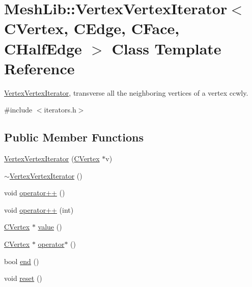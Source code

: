 \hypertarget{class_mesh_lib_1_1_vertex_vertex_iterator}{}\section{Mesh\+Lib\+:\+:Vertex\+Vertex\+Iterator$<$ C\+Vertex, C\+Edge, C\+Face, C\+Half\+Edge $>$ Class Template Reference}
\label{class_mesh_lib_1_1_vertex_vertex_iterator}


\hyperlink{class_mesh_lib_1_1_vertex_vertex_iterator}{Vertex\+Vertex\+Iterator}, transverse all the neighboring vertices of a vertex ccwly.  




{\ttfamily \#include $<$iterators.\+h$>$}

\subsection*{Public Member Functions}
\begin{DoxyCompactItemize}
\item 
\hyperlink{class_mesh_lib_1_1_vertex_vertex_iterator_accadfb697db93459561c07d916519342}{Vertex\+Vertex\+Iterator} (\hyperlink{class_mesh_lib_1_1_c_vertex}{C\+Vertex} $\ast$v)
\item 
\hyperlink{class_mesh_lib_1_1_vertex_vertex_iterator_aa72ea636a0eb13eac5c0309f0aeb5dbe}{$\sim$\+Vertex\+Vertex\+Iterator} ()
\item 
void \hyperlink{class_mesh_lib_1_1_vertex_vertex_iterator_a2e5ca2acaa3484f6e1a41cc3d3688633}{operator++} ()
\item 
void \hyperlink{class_mesh_lib_1_1_vertex_vertex_iterator_a3b300ab317110d48cebfb281583524b7}{operator++} (int)
\item 
\hyperlink{class_mesh_lib_1_1_c_vertex}{C\+Vertex} $\ast$ \hyperlink{class_mesh_lib_1_1_vertex_vertex_iterator_a469255261d5be758b575bfb7203916a4}{value} ()
\item 
\hyperlink{class_mesh_lib_1_1_c_vertex}{C\+Vertex} $\ast$ \hyperlink{class_mesh_lib_1_1_vertex_vertex_iterator_ad3a5cb15e9e639451530ba39ecf33cda}{operator$\ast$} ()
\item 
bool \hyperlink{class_mesh_lib_1_1_vertex_vertex_iterator_a8609fe0fa5480e662595342a9efb25ca}{end} ()
\item 
void \hyperlink{class_mesh_lib_1_1_vertex_vertex_iterator_ad04ea35dc53a8df21d5257e265e2a045}{reset} ()
\end{DoxyCompactItemize}


